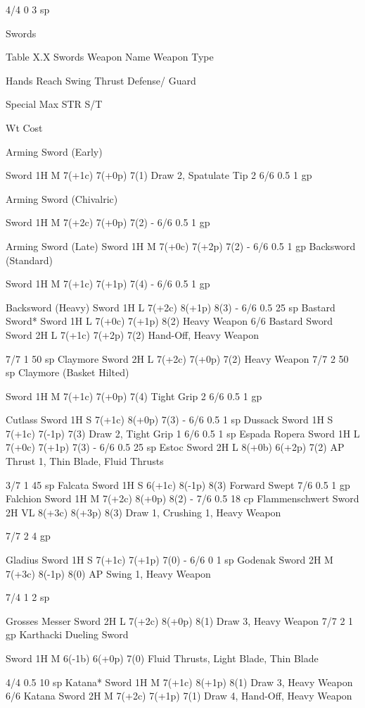 \documentclass[oneside,11pt,english]{book}
\begin{document}
4/4 0 3 sp 

 

Swords 

 
Table X.X Swords 
Weapon Name Weapon 
Type 

Hands Reach Swing Thrust Defense/ 
Guard 

Special Max 
STR S/T 

Wt Cost 

Arming Sword 
(Early) 

Sword 1H M 7(+1c) 7(+0p) 7(1) Draw 2, Spatulate Tip 2 6/6 0.5 1 gp 

Arming Sword 
(Chivalric) 

Sword 1H M 7(+2c) 7(+0p) 7(2) - 6/6 0.5 1 gp 

Arming Sword (Late) Sword 1H M 7(+0c) 7(+2p) 7(2) - 6/6 0.5 1 gp 
Backsword 
(Standard) 

Sword 1H M 7(+1c) 7(+1p) 7(4) - 6/6 0.5 1 gp 

Backsword (Heavy) Sword 1H L 7(+2c) 8(+1p) 8(3) - 6/6 0.5 25 
sp 
Bastard Sword* Sword 1H L 7(+0c) 7(+1p) 8(2) Heavy Weapon 6/6 
Bastard Sword Sword 2H L 7(+1c) 7(+2p) 7(2) Hand-Off, Heavy 
Weapon 

7/7 1 50 
sp 
Claymore Sword 2H L 7(+2c) 7(+0p) 7(2) Heavy Weapon 7/7 2 50 
sp 
Claymore (Basket 
Hilted) 

Sword 1H M 7(+1c) 7(+0p) 7(4) Tight Grip 2 6/6 0.5 1 gp 

Cutlass Sword 1H S 7(+1c) 8(+0p) 7(3) - 6/6 0.5 1 sp 
Dussack Sword 1H S 7(+1c) 7(-1p) 7(3) Draw 2, Tight Grip 1 6/6 0.5 1 sp 
Espada Ropera Sword 1H L 7(+0c) 7(+1p) 7(3) - 6/6 0.5 25 
sp 
Estoc Sword 2H L 8(+0b) 6(+2p) 7(2) AP Thrust 1, Thin 
Blade, Fluid Thrusts 

3/7 1 45 
sp 
Falcata Sword 1H S 6(+1c) 8(-1p) 8(3) Forward Swept 7/6 0.5 1 gp 
Falchion Sword 1H M 7(+2c) 8(+0p) 8(2) - 7/6 0.5 18 
cp 
Flammenschwert Sword 2H VL 8(+3c) 8(+3p) 8(3) Draw 1, Crushing 1, 
Heavy Weapon 

7/7 2 4 gp 


Gladius Sword 1H S 7(+1c) 7(+1p) 7(0) - 6/6 0 1 sp 
Godenak Sword 2H M 7(+3c) 8(-1p) 8(0) AP Swing 1, Heavy 
Weapon 

7/4 1 2 sp 

Grosses Messer Sword 2H L 7(+2c) 8(+0p) 8(1) Draw 3, Heavy Weapon 7/7 2 1 gp 
Karthacki Dueling 
Sword 

Sword 1H M 6(-1b) 6(+0p) 7(0) Fluid Thrusts, Light 
Blade, Thin Blade 

4/4 0.5 10 
sp 
Katana* Sword 1H M 7(+1c) 8(+1p) 8(1) Draw 3, Heavy Weapon 6/6 
Katana Sword 2H M 7(+2c) 7(+1p) 7(1) Draw 4, Hand-Off, 
Heavy Weapon 
\end{document}
